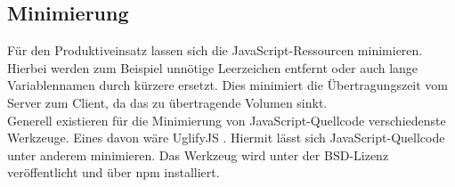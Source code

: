 \subsection{Minimierung}
Für den Produktiveinsatz lassen sich die JavaScript-Ressourcen minimieren. Hierbei werden zum Beispiel unnötige Leerzeichen entfernt oder auch lange Variablennamen durch kürzere ersetzt. Dies minimiert die Übertragungszeit vom Server zum Client, da das zu übertragende Volumen sinkt.\\
Generell existieren für die Minimierung von JavaScript-Quellcode verschiedenste Werkzeuge. Eines davon wäre UglifyJS \cite{Bazon2016}. Hiermit lässt sich JavaScript-Quellcode unter anderem minimieren. Das Werkzeug wird unter der BSD-Lizenz veröffentlicht und über \ac{npm} installiert.	